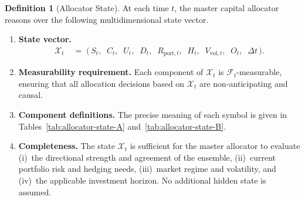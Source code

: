\documentclass[12pt,openany]{book}
\newcommand{\calX}{\mathcal{X}}
\numberwithin{equation}{chapter}
\theoremstyle{plain}
\theoremstyle{definition}
\newtheorem{definition}[theorem]{Definition}
\theoremstyle{remark}
\numberwithin{equation}{chapter}
\theoremstyle{plain}
\begin{document}
\begin{definition}[Allocator State]
\label{def:allocator-state}
At each time $t$, the master capital allocator reasons over
the following multidimensional state vector.

\begin{enumerate}
  \item \textbf{State vector.}
        \begin{align}
          \calX_t
          &\;=\;
          \bigl(\,
            S_t,\;\;
            C_t,\;\;
            U_t,\;\;
            D_t,\;\;
            R_{\mathrm{port},t},\;\;
            H_t,\;\;
            V_{\mathrm{vol},t},\;\;
            O_t,\;\;
            \Delta t
          \,\bigr).
          \label{eq:allocator-state}
        \end{align}

  \item \textbf{Measurability requirement.}
        Each component of $\calX_t$ is
        $\mathcal{F}_t$-measurable, ensuring that all
        allocation decisions based on $\calX_t$ are
        non-anticipating and causal.

  \item \textbf{Component definitions.}
        The precise meaning of each symbol is given in
        Tables~\ref{tab:allocator-state-A}
        and~\ref{tab:allocator-state-B}.

  \item \textbf{Completeness.}
        The state $\calX_t$ is sufficient for the
        master allocator to evaluate
        (i)~the directional strength and agreement of the
        ensemble, (ii)~current portfolio risk and hedging
        needs, (iii)~market regime and volatility, and
        (iv)~the applicable investment horizon.
        No additional hidden state is assumed.
\end{enumerate}
\end{definition}
\end{document}
